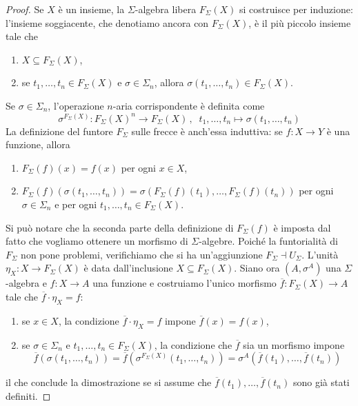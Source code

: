\begin{proof}
 Se \(X\) è un insieme, la \(\Sigma\)-algebra libera \(F_{\Sigma}(X)\) si costruisce per induzione: l'insieme soggiacente, che denotiamo
 ancora con \(F_{\Sigma}(X)\), è il più piccolo insieme tale che
 \begin{enumerate}
  \item[(i)] \(X \subseteq F_{\Sigma}(X)\),
  \item[(ii)] se \(t_1,\ldots,t_n \in F_{\Sigma}(X)\) e \(\sigma \in \Sigma_n\), allora \(\sigma(t_1,\ldots,t_n) \in F_{\Sigma}(X)\).
 \end{enumerate}
 Se \(\sigma \in \Sigma_n\), l'operazione \(n\)-aria corrispondente è definita come
 \[\sigma^{F_{\Sigma}(X)} \colon F_{\Sigma}(X)^n \to F_{\Sigma}(X) \,,\;\; t_1,\ldots,t_n \mapsto \sigma(t_1,\ldots,t_n)\]
 La definizione del funtore \(F_{\Sigma}\) sulle frecce è anch'essa induttiva: se \(f \colon X \to Y\) è una funzione, allora
 \begin{enumerate}
  \item[(i)] \(F_{\Sigma}(f)(x) = f(x)\) per ogni \(x \in X\),
  \item[(ii)] \(F_{\Sigma}(f)(\sigma(t_1,\ldots,t_n)) = \sigma(F_{\Sigma}(f)(t_1), \ldots, F_{\Sigma}(f)(t_n))\) per ogni
        \(\sigma \in \Sigma_n\) e per ogni \(t_1,\ldots,t_n \in F_{\Sigma}(X)\).
 \end{enumerate}
 Si può notare che la seconda parte della definizione di \(F_{\Sigma}(f)\) è imposta dal fatto che vogliamo ottenere un morfismo
 di \(\Sigma\)-algebre. Poiché la funtorialità di \(F_{\Sigma}\) non pone problemi, verifichiamo che si ha un'aggiunzione
 \(F_{\Sigma} \dashv U_{\Sigma}\). L'unità \(\eta_X \colon X \to F_{\Sigma}(X)\) è data dall'inclusione \(X \subseteq F_{\Sigma}(X)\).
 Siano ora \((A,\sigma^A)\) una \(\Sigma\)-algebra e \(f \colon X \to A\) una funzione e costruiamo l'unico morfismo
 \(\overline{f} \colon F_{\Sigma}(X) \to A\) tale che \(\overline{f} \cdot \eta_X = f\colon\)
 \begin{enumerate}
  \item[(i)] se \(x \in X\), la condizione \(\overline{f} \cdot \eta_X = f\) impone \(\overline{f}(x) = f(x)\),
  \item[(ii)] se \(\sigma \in \Sigma_n\) e \(t_1,\ldots,t_n \in F_{\Sigma}(X)\), la condizione che \(\overline{f}\) sia un morfismo impone
        \[\overline{f}(\sigma(t_1,\ldots,t_n)) = \overline{f}(\sigma^{F_{\Sigma}(X)}(t_1,\ldots,t_n)) = \sigma^A(\overline{f}(t_1),\ldots,\overline{f}(t_n))\]
 \end{enumerate}
 il che conclude la dimostrazione se si assume che \(\overline{f}(t_1),\ldots,\overline{f}(t_n)\) sono già stati definiti.
\end{proof}

